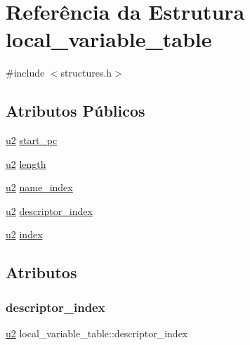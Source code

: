 \hypertarget{structlocal__variable__table}{}\section{Referência da Estrutura local\+\_\+variable\+\_\+table}
\label{structlocal__variable__table}


{\ttfamily \#include $<$structures.\+h$>$}

\subsection*{Atributos Públicos}
\begin{DoxyCompactItemize}
\item 
\hyperlink{lista__operandos_8h_a732cde1300aafb73b0ea6c2558a7a54f}{u2} \hyperlink{structlocal__variable__table_aa86e910619df9b3284535529bc887a12}{start\+\_\+pc}
\item 
\hyperlink{lista__operandos_8h_a732cde1300aafb73b0ea6c2558a7a54f}{u2} \hyperlink{structlocal__variable__table_a76b778cea6d99b0854cba21e223569cc}{length}
\item 
\hyperlink{lista__operandos_8h_a732cde1300aafb73b0ea6c2558a7a54f}{u2} \hyperlink{structlocal__variable__table_a6c91f7b672683a35b1433c429de69069}{name\+\_\+index}
\item 
\hyperlink{lista__operandos_8h_a732cde1300aafb73b0ea6c2558a7a54f}{u2} \hyperlink{structlocal__variable__table_adb823a30762d64e9d20f674ae7923bfc}{descriptor\+\_\+index}
\item 
\hyperlink{lista__operandos_8h_a732cde1300aafb73b0ea6c2558a7a54f}{u2} \hyperlink{structlocal__variable__table_af13a15b5fbb398323997b88d341a6c38}{index}
\end{DoxyCompactItemize}


\subsection{Atributos}
\mbox{\label{structlocal__variable__table_adb823a30762d64e9d20f674ae7923bfc}} 
\subsubsection{\texorpdfstring{descriptor\+\_\+index}{descriptor\_index}}
{\footnotesize\ttfamily \hyperlink{lista__operandos_8h_a732cde1300aafb73b0ea6c2558a7a54f}{u2} local\+\_\+variable\+\_\+table\+::descriptor\+\_\+index}

